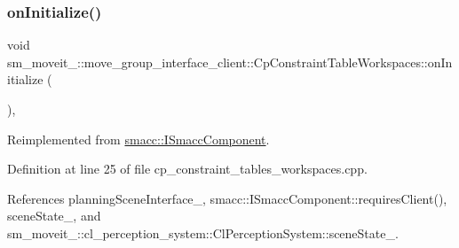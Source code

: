 \subsubsection{\texorpdfstring{on\+Initialize()}{onInitialize()}}
{\footnotesize\ttfamily void sm\+\_\+moveit\+\_\+::move\+\_\+group\+\_\+interface\+\_\+client\+::\+Cp\+Constraint\+Table\+Workspaces\+::on\+Initialize (\begin{DoxyParamCaption}{ }\end{DoxyParamCaption})\hspace{0.3cm}{\ttfamily [override]}, {\ttfamily [virtual]}}



Reimplemented from \hyperlink{classsmacc_1_1ISmaccComponent_ae6f71d008db12553912e9436184b9e65}{smacc\+::\+I\+Smacc\+Component}.



Definition at line 25 of file cp\+\_\+constraint\+\_\+tables\+\_\+workspaces.\+cpp.



References planning\+Scene\+Interface\+\_\+, smacc\+::\+I\+Smacc\+Component\+::requires\+Client(), scene\+State\+\_\+, and sm\+\_\+moveit\+\_\+::cl\+\_\+perception\+\_\+system\+::\+Cl\+Perception\+System\+::scene\+State\+\_\+.


